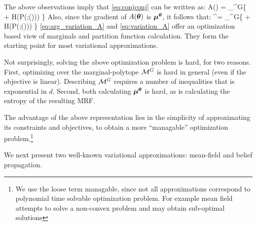 The above observations imply that \eqref{eq:conjconj} can be written as:
\be
A(\thetav) = \sup_{\muv \in \margpoly^G}\left \{ \muv \cdot \thetav + H(P(\xx;\thetav(\muv))) \right\} \label{eq:variation_A} 
\ee
Also, since the gradient of $A(\boldsymbol{\theta})$ is $\boldsymbol{\mu}^{\boldsymbol{\theta}}$, it follows that:
\be
\muv^{\thetav}= \arg \sup_{\muv \in \margpoly^G}\left \{ \muv \cdot \thetav + H(P(\xx;\thetav(\muv))) \right\} \label{eq:arg_variation_A}
\ee
\eqref{eq:arg_variation_A} and \eqref{eq:variation_A} offer an optimization based view of marginals and partition function calculation. They form the starting point for most
variational approximations.


Not surprisingly, solving the above optimization problem is hard, for two reasons. First,  optimizing over the marginal-polytope ${\cal{M}}^G$ is hard in general (even if the objective is linear). Describing ${\cal{M}}^G$ requires a number of inequalities that is exponential in $d$.  Second, both calculating $\boldsymbol{\mu}^{\boldsymbol{\theta}}$ is hard, as is calculating the entropy of the resulting MRF.

The advantage of the above representation lies in the simplicity of approximating its constraints and objectives, to obtain a more ``managable'' optimization problem.\footnote{We use the loose term managable, since not all approximations correspond to polynomial time solvable optimization problem. For example mean field attempts to solve a non-convex problem and may obtain sub-optimal solutions}

{We next present two well-known variational approximations: mean-field and belief propagation}.
